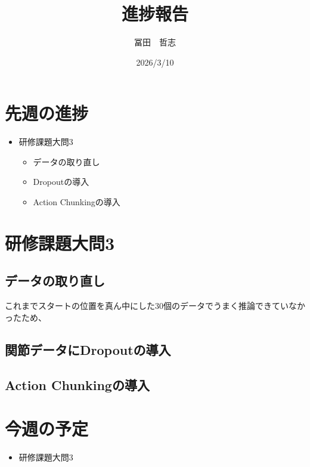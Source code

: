 \documentclass{jsarticle}
\title{進捗報告}
\author{冨田　哲志}
\date{2026/3/10}
\begin{document}
\maketitle

\section{先週の進捗}
\begin{itemize}
    \item 研修課題大問3
     \begin{itemize}
         \item データの取り直し
         \item Dropoutの導入
         \item Action Chunkingの導入
     \end{itemize}
    
        
\end{itemize}

\section{研修課題大問3}
\subsection{データの取り直し}
これまでスタートの位置を真ん中にした30個のデータでうまく推論できていなかったため、
\subsection{関節データにDropoutの導入}
\subsection{Action Chunkingの導入}




\subsection{}










\section{今週の予定}
\begin{itemize}
    \item 研修課題大問3
\end{itemize}
\end{document}
